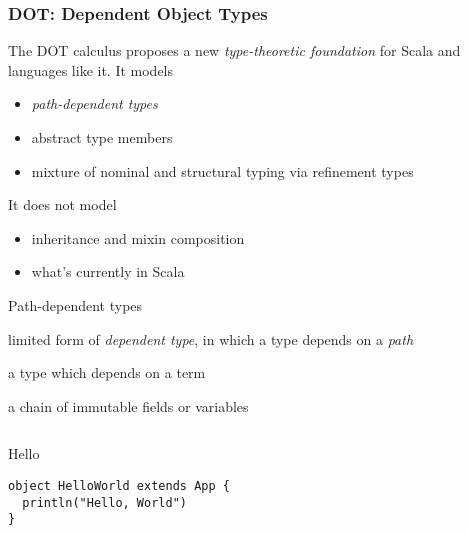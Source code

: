 \documentclass{beamer}
\begin{document}
\begin{frame}
\frametitle{DOT: Dependent Object Types}

The DOT calculus proposes a new \emph{type-theoretic foundation} for Scala
and languages like it. It models
\begin{itemize}
\item \emph{path-dependent types}
\item abstract type members
\item mixture of nominal and structural typing via refinement types
\end{itemize}

It does not model
\begin{itemize}
\item inheritance and mixin composition
\item what's currently in Scala
\end{itemize}

\end{frame}

\begin{frame}[fragile]{Path-dependent types}

\begin{description}
\item[path-dependent type] limited form of \emph{dependent type}, in which a type depends on a \emph{path}
\item[dependent type] a type which depends on a term
\item[path] a chain of immutable fields or variables
\end{description}

\inputminted[frame=lines,fontsize=\footnotesize]{scala}{intro.scala}

\end{frame}

\begin{frame}[fragile]{Hello}
\begin{verbatim}
object HelloWorld extends App {
  println("Hello, World")
}
\end{verbatim}
\end{frame}
\end{document}
